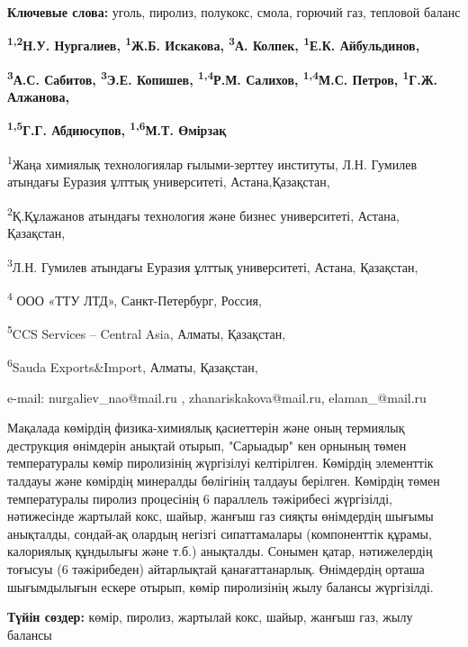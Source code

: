 {\bfseries Ключевые слова:} уголь, пиролиз, полукокс, смола, горючий газ,
тепловой баланс


\begin{center}
{\bfseries \textsuperscript{1,2}Н.У. Нургалиев\envelope, \textsuperscript{1}Ж.Б.
Искакова\envelope, \textsuperscript{3}А. Колпек, \textsuperscript{1}Е.К.
Айбульдинов\envelope,}

{\bfseries \textsuperscript{3}А.С. Сабитов, \textsuperscript{3}Э.Е.
Копишев, \textsuperscript{1,4}Р.М. Салихов, \textsuperscript{1,4}М.С.
Петров, \textsuperscript{1}Г.Ж. Алжанова,}

{\bfseries \textsuperscript{1,5}Г.Г. Абдиюсупов, \textsuperscript{1,6}М.Т.
Өмірзақ}

\textsuperscript{1}Жаңа химиялық технологиялар ғылыми-зерттеу институты,
Л.Н. Гумилев атындағы Еуразия ұлттық университеті, Астана,Қазақстан,

\textsuperscript{2}Қ.Құлажанов атындағы технология және бизнес
университеті, Астана, Қазақстан,

\textsuperscript{3}Л.Н. Гумилев атындағы Еуразия ұлттық университеті,
Астана, Қазақстан,

\textsuperscript{4} ООО «ТТУ ЛТД», Санкт-Петербург, Россия,

\textsuperscript{5}CCS Services -- Central Asia, Алматы, Қазақстан,

\textsuperscript{6}Sauda Exports\&Import, Алматы, Қазақстан,

e-mail: nurgaliev\_nao@mail.ru , zhanariskakova@mail.ru,
elaman\_@mail.ru
\end{center}

Мақалада көмірдің физика-химиялық қасиеттерін және оның термиялық
деструкция өнімдерін анықтай отырып, "Сарыадыр" кен орнының төмен
температуралы көмір пиролизінің жүргізілуі келтірілген. Көмірдің
элементтік талдауы және көмірдің минералды бөлігінің талдауы берілген.
Көмірдің төмен температуралы пиролиз процесінің 6 параллель тәжірибесі
жүргізілді, нәтижесінде жартылай кокс, шайыр, жанғыш газ сияқты
өнімдердің шығымы анықталды, сондай-ақ олардың негізгі сипаттамалары
(компоненттік құрамы, калориялық құндылығы және т.б.) анықталды. Сонымен
қатар, нәтижелердің тоғысуы (6 тәжірибеден) айтарлықтай қанағаттанарлық.
Өнімдердің орташа шығымдылығын ескере отырып, көмір пиролизінің жылу
балансы жүргізілді.

{\bfseries Түйін сөздер:} көмір, пиролиз, жартылай кокс, шайыр, жанғыш газ,
жылу балансы

